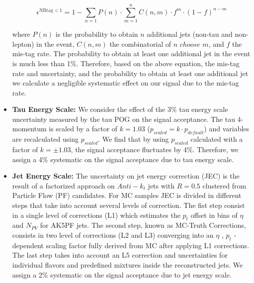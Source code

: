 \begin{itemize}
	\begin{equation}\label{eq:nttbar}
	\epsilon^{\textrm{NBtag} < 1} = 1 - \sum_{n=1} P(n) \cdot \sum_{m=1}^{n} C(n,m) \cdot f^{m} \cdot (1-f)^{n-m}
	\end{equation}
	
	where $P(n)$ is the probability to obtain $n$ additional jets (non-tau and non-lepton) in the event, $C(n,m)$ the combinatorial of $n$ $choose$ $m$, and $f$ the mis-tag rate. The probability to obtain at least one additional jet in the event is much less than 1\%. Therefore, based on the above equation, the mis-tag rate and uncertainty, and the probability to obtain at least one additional jet we calculate a negligible systematic effect on our signal due to the mis-tag rate.
	
	\item \textbf{Tau Energy Scale:} We consider the effect of the 3\% tau energy scale uncertainty measured by the tau POG on the signal acceptance. The tau 4-momentum is scaled by a factor of $k=1.03$ ($p_{scaled} = k \cdot p_{default}$) and variables are recalculated using $p_{scaled}$. We find that by using $p_{scaled}$ calculated with a factor of $k=\pm 1.03$, the signal acceptance fluctuates by 4\%. Therefore, we assign a 4\% systematic on the signal acceptance due to tau energy scale.
	\item \textbf{Jet Energy Scale:}  The uncertainty on jet energy correction (JEC) is the result of a factorized approach on $Anti­-k_{t}$ jets with $R=0.5$ clustered from Particle Flow (PF) candidates. For MC samples JEC is divided in different steps that take into account several levels of correction. The fist step consist in a single level of corrections (L1) which estimates the $p_{t}$ offset in bins of $\eta$ and $N_{PV}$ for AK5PF jets. The second step, known as MC-Truth Corrections, consists in two level of corrections (L2 and L3) converging into an $\eta$ , $p_{t}$ ­dependent scaling factor fully derived from MC after applying L1­ corrections. The last step takes into account an L5 correction and uncertainties for individual flavors and predefined mixtures inside the reconstructed jets. We assign a 2\% systematic on the signal acceptance due to jet energy scale.

\end{itemize}
